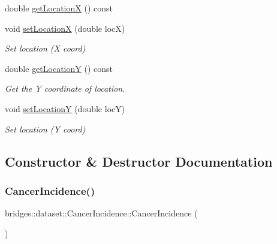\begin{DoxyCompactItemize}
double \hyperlink{classbridges_1_1dataset_1_1_cancer_incidence_a982dc26b86ddeddf57d284b78dfd0752}{get\+LocationX} () const
\item 
void \hyperlink{classbridges_1_1dataset_1_1_cancer_incidence_af373c05a20c7a230f62be3ed53889787}{set\+LocationX} (double locX)
\begin{DoxyCompactList}\small\item\em Set location (X coord) \end{DoxyCompactList}\item 
double \hyperlink{classbridges_1_1dataset_1_1_cancer_incidence_af962caa4876c628cae5beaca9780650e}{get\+LocationY} () const
\begin{DoxyCompactList}\small\item\em Get the Y coordinate of location. \end{DoxyCompactList}\item 
void \hyperlink{classbridges_1_1dataset_1_1_cancer_incidence_ab18e0703f97909a0a37c5e9a3460736a}{set\+LocationY} (double locY)
\begin{DoxyCompactList}\small\item\em Set location (Y coord) \end{DoxyCompactList}\end{DoxyCompactItemize}


\subsection{Constructor \& Destructor Documentation}
\mbox{\label{classbridges_1_1dataset_1_1_cancer_incidence_a2a6314af5704aa8f9f962738e12cd9dc}} 
\subsubsection{\texorpdfstring{Cancer\+Incidence()}{CancerIncidence()}}
{\footnotesize\ttfamily bridges\+::dataset\+::\+Cancer\+Incidence\+::\+Cancer\+Incidence (\begin{DoxyParamCaption}{ }\end{DoxyParamCaption})\hspace{0.3cm}{\ttfamily [inline]}}



